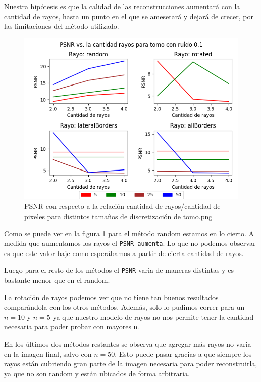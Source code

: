 Nuestra hipótesis es que la calidad de las reconstrucciones aumentará con la cantidad de rayos,
hasta un punto en el que se amesetará y dejará de crecer, por las limitaciones del método utilizado.

\begin{figure}[H]
    \centering
    \includegraphics[width=\textwidth]{../graficos/ray_params/tomo/noise_graph_0.png}
    \caption{PSNR con respecto a la relación cantidad de rayos/cantidad de pixeles para distintos tamaños de discretización de tomo.png}
    \label{fig:exp-rayN-tomo}
\end{figure}

Como se puede ver en la figura \ref{fig:exp-rayN-tomo} para el método random estamos en lo cierto. A medida que aumentamos los rayos el \verb|PSNR aumenta|. Lo que no podemos observar es que este valor baje como esperábamos a partir de cierta cantidad de rayos. 

Luego para el resto de los métodos el \verb|PSNR| varia de maneras distintas y es bastante menor que en el random. 

La rotación de rayos podemos ver que no tiene tan buenos resultados comparándola con los otros métodos.
Además, solo lo pudimos correr para un $n=10$ y $n=5$ ya que nuestro modelo de rayos no nos permite tener la cantidad necesaria para poder probar con mayores \verb|n|.

En los últimos dos métodos restantes se observa que agregar más rayos no varia en la imagen final, salvo con $n = 50$. Esto puede pasar gracias a que siempre los rayos están cubriendo gran parte de la imagen necesaria para poder reconstruirla, ya que no son random y están ubicados de forma arbitraria. 

